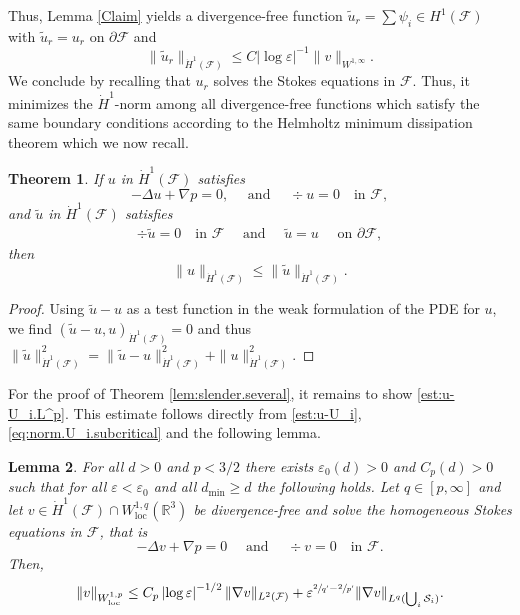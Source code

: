 \documentclass[10pt]{amsart}
\newcommand{\R}{\mathbb{R}}
\let\eps\varepsilon
\newcommand{\cS}{\mathcal{S}}
\newcommand{\dmin}{d_{\min}}
\newcommand{\loc}{\mathrm{loc}}
\newtheorem{thm}{Theorem}[section]
\newtheorem{Lemma}[thm]{Lemma}
\theoremstyle{definition}
\theoremstyle{remark}
\let\oldbigcup\bigcup
\begin{document}
Thus, Lemma \ref{Claim} yields a divergence-free function $\tilde u_r = \sum \psi_i \in H^1(\mathcal F)$ with $\tilde u_r = u_r$ on $\partial \mathcal F$ and
\begin{equation}
\|\tilde u_r \|_{\dot H^1(\mathcal F)} \leq C \left|\log \eps \right|^{-1} \|v\|_{W^{1,\infty}}.
\end{equation}
We conclude by recalling that $u_r$ solves the Stokes equations in $\mathcal F$. Thus, it minimizes the $\dot H^1$-norm among all divergence-free functions which satisfy the same boundary conditions according to the Helmholtz minimum dissipation theorem which we now recall.

\begin{thm}
\label{Helmholtz}
If $u $ in $\dot H^1({\mathcal F})$ satisfies
\begin{equation*}
- \Delta u + \nabla p = 0, \quad \text{ and }\quad \div u = 0 \quad \text{in } \mathcal F,
\end{equation*}
and $\tilde u $ in $\dot H^1({\mathcal F})$ satisfies
\begin{equation*}
\begin{aligned}
\div \tilde u = 0 \quad \text{in } \mathcal F \quad \text{ and }\quad
\tilde u = u \quad \text{ on } \partial \mathcal F,
\end{aligned}
\end{equation*}
then
\begin{equation*}
\|u\|_{\dot H^1({\mathcal F})}
\leq \|\tilde u\|_{\dot H^1({\mathcal F})}.
\end{equation*}
\end{thm}
\begin{proof}
Using $\tilde u - u$ as a test function in the weak formulation of the PDE for $u$, we find $(\tilde u - u,u)_{\dot H^1({\mathcal F})} =0$
and thus $\|\tilde u\|^2_{\dot H^1({\mathcal F})} = \|\tilde u - u\|^2_{\dot H^1({\mathcal F})} + \| u\|^2_{\dot H^1({\mathcal F})}$.
\end{proof}

For the proof of Theorem \ref{lem:slender.several}, it remains to show \eqref{est:u-U_i.L^p}. This estimate follows directly from \eqref{est:u-U_i}, \eqref{eq:norm.U_i.subcritical} and the following lemma.

\begin{Lemma}\label{lem:improved}
For all $d> 0$ and $p < 3/2$ there exists $\eps_0(d)>0$ and $C_p(d)>0$ such that for all $\eps < \eps_0$ and all $\dmin \geq d$ the following holds. Let $q \in [p,\infty]$ and let $v \in \dot H^1(\mathcal F) \cap W^{1,q}_{\loc}(\R^3)$ be divergence-free and solve the homogeneous Stokes equations in $\mathcal F$, that is
\begin{equation*}
- \Delta v + \nabla p = 0 \quad \text{ and } \quad \div v = 0 \quad \text{in } \mathcal F.
\end{equation*}
Then,
\begin{equation}
\|v\|_{W^{1,p}_\loc} \leq C_p \left|\log \eps\right|^{-1/2} \|\nabla v\|_{L^2(\mathcal F)} + \eps^{\sfrac 2 {q'} - \sfrac{2}{p'}} \|\nabla v\|_{L^q(\oldbigcup_i \cS_i)}.
\end{equation}
\end{Lemma}
\end{document}
